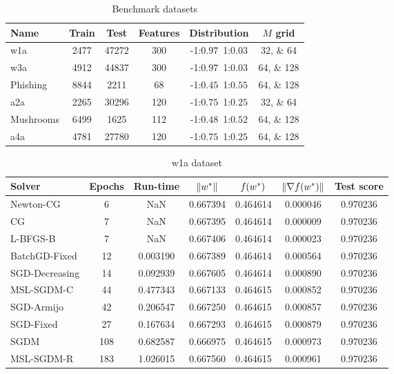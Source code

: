 \begin{table}
\centering
\caption{Benchmark datasets}
\label{tab:datasets}
\begin{tabular}{lSSScc}
\toprule
Name & {Train} & {Test} & {Features} & {Distribution} & {$M$ grid} \\
\midrule
w1a & 2477 & 47272 & 300 & -1:$0.97$\,\,\,1:$0.03$ &
\numlist[list-pair-separator={, }]{32;64} \\
w3a & 4912 & 44837 & 300 & -1:$0.97$\,\,\,1:$0.03$ &
\numlist[list-pair-separator={, }]{64;128} \\
Phishing & 8844 & 2211 & 68 & -1:$0.45$\,\,\,1:$0.55$ &
\numlist[list-pair-separator={, }]{64;128} \\
a2a & 2265 & 30296 & 120 & -1:$0.75$\,\,\,1:$0.25$ &
\numlist[list-pair-separator={, }]{32;64} \\
Mushrooms & 6499 & 1625 & 112 & -1:$0.48$\,\,\,1:$0.52$ &
\numlist[list-pair-separator={, }]{64;128} \\
a4a & 4781 & 27780 & 120 & -1:$0.75$\,\,\,1:$0.25$ &
\numlist[list-pair-separator={, }]{64;128} \\
\bottomrule
\end{tabular}
\end{table}

\cleardoublepage

\begin{table}
\centering
\caption{w1a dataset}
\label{tab:w1a-table}
\begin{tabular}{lS[drop-zero-decimal]S[round-precision=4]S[round-precision=6]S[round-precision=6]S[exponent-mode=scientific]S[round-precision=6]}
\toprule
Solver & {Epochs} & {Run-time} & {$\lVert w^\ast\rVert$} & {$\operatorname*{\mathit{f}}(w^\ast)$} & {$\lVert\nabla f(w^\ast)\rVert$} & {Test score} \\
\midrule
Newton-CG & 6 & NaN & 0.667394 & 0.464614 & 0.000046 & 0.970236 \\
CG & 7 & NaN & 0.667395 & 0.464614 & 0.000009 & 0.970236 \\
L-BFGS-B & 7 & NaN & 0.667406 & 0.464614 & 0.000023 & 0.970236 \\
BatchGD-Fixed & 12 & 0.003190 & 0.667389 & 0.464614 & 0.000564 & 0.970236 \\
SGD-Decreasing & 14 & 0.092939 & 0.667605 & 0.464614 & 0.000890 & 0.970236 \\
MSL-SGDM-C & 44 & 0.477343 & 0.667133 & 0.464615 & 0.000852 & 0.970236 \\
SGD-Armijo & 42 & 0.206547 & 0.667250 & 0.464615 & 0.000857 & 0.970236 \\
SGD-Fixed & 27 & 0.167634 & 0.667293 & 0.464615 & 0.000879 & 0.970236 \\
SGDM & 108 & 0.682587 & 0.666975 & 0.464615 & 0.000973 & 0.970236 \\
MSL-SGDM-R & 183 & 1.026015 & 0.667560 & 0.464615 & 0.000961 & 0.970236 \\
\bottomrule
\end{tabular}
\end{table}

